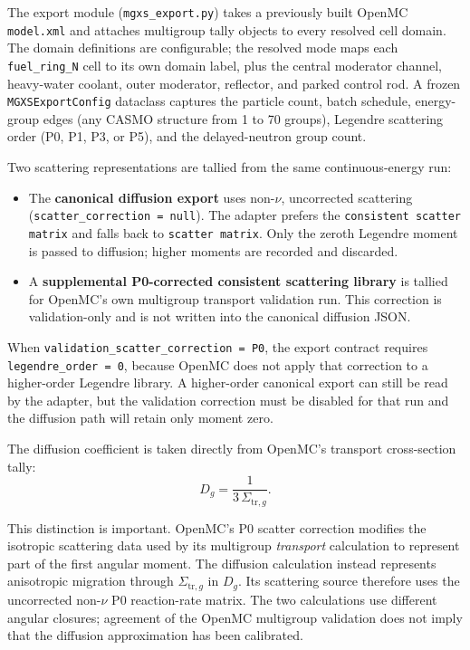 \documentclass[11pt]{article}
\begin{document}
The export module (\texttt{mgxs\_export.py}) takes a previously built OpenMC
\texttt{model.xml} and attaches multigroup tally objects to every resolved
cell domain.  The domain definitions are configurable; the resolved mode maps
each \texttt{fuel\_ring\_N} cell to its own domain label, plus the central
moderator channel, heavy-water coolant, outer moderator, reflector, and
parked control rod.  A frozen \texttt{MGXSExportConfig} dataclass captures the
particle count, batch schedule, energy-group edges (any CASMO structure from
1 to 70 groups), Legendre scattering order (P0, P1, P3, or P5), and the
delayed-neutron group count.

Two scattering representations are tallied from the same continuous-energy
run:
\begin{itemize}
  \item The \textbf{canonical diffusion export} uses non-$\nu$, uncorrected
        scattering (\texttt{scatter\_correction = null}).  The adapter prefers
        the \texttt{consistent scatter matrix} and falls back to
        \texttt{scatter matrix}.  Only the zeroth Legendre moment is passed to
        diffusion; higher moments are recorded and discarded.
  \item A \textbf{supplemental P0-corrected consistent scattering library}
        is tallied for OpenMC's own multigroup transport validation run.
        This correction is validation-only and is not written into the
        canonical diffusion JSON.
\end{itemize}

When \texttt{validation\_scatter\_correction = P0}, the export contract requires
\texttt{legendre\_order = 0}, because OpenMC does not apply that correction to
a higher-order Legendre library.  A higher-order canonical export can still be
read by the adapter, but the validation correction must be disabled for that
run and the diffusion path will retain only moment zero.

The diffusion coefficient is taken directly from OpenMC's transport
cross-section tally:
\[
D_g = \frac{1}{3\,\Sigma_{\mathrm{tr},g}} .
\]

This distinction is important.  OpenMC's P0 scatter correction modifies the
isotropic scattering data used by its multigroup \emph{transport} calculation
to represent part of the first angular moment.  The diffusion calculation
instead represents anisotropic migration through $\Sigma_{\mathrm{tr},g}$ in
$D_g$.  Its scattering source therefore uses the uncorrected non-$\nu$ P0
reaction-rate matrix.  The two calculations use different angular closures;
agreement of the OpenMC multigroup validation does not imply that the
diffusion approximation has been calibrated.
\end{document}
